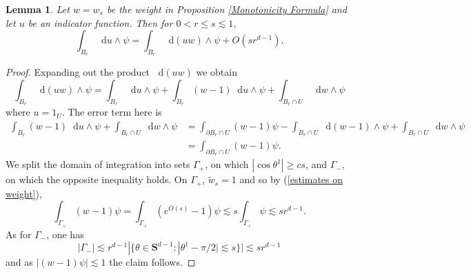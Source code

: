 \documentclass[reqno,12pt,letterpaper]{amsart}
\newcommand{\Sph}{\mathbf S}
\newcommand*\dif{\mathop{}\!\mathrm{d}}
\newtheorem{lemma}[theorem]{Lemma}
\theoremstyle{definition}
\numberwithin{equation}{section}
\begin{document}
\begin{lemma}\label{restore the weight}
Let $w = w_s$ be the weight in Proposition \ref{Monotonicity Formula} and let $u$ be an indicator function. Then for $0 < r \leq s \lesssim 1$,
$$\int_{B_r} \dif u \wedge \psi = \int_{B_r} \dif(uw) \wedge \psi + O(s r^{d - 1}).$$
\end{lemma}
\begin{proof}
Expanding out the product $\dif(uw)$ we obtain 
$$\int_{B_r} \dif(uw) \wedge \psi = \int_{B_r} \dif u \wedge \psi + \int_{B_r} (w - 1) \dif u \wedge \psi + \int_{B_r \cap U} \dif w \wedge \psi$$
where $u = 1_U$.
The error term here is 
\begin{align*}
\int_{B_r} (w - 1) \dif u \wedge \psi + \int_{B_r \cap U} \dif w \wedge \psi
&= \int_{\partial B_r \cap U} (w - 1)\psi - \int_{B_r \cap U} \dif (w - 1) \wedge \psi + \int_{B_r \cap U} \dif w \wedge \psi \\
&= \int_{\partial B_r \cap U} (w - 1)\psi.
\end{align*}
We split the domain of integration into sets $\Gamma_+$, on which $|\cos \theta^1| \geq cs$, and $\Gamma_-$, on which the opposite inequality holds.
On $\Gamma_+$, $\tilde w_s = 1$ and so by (\ref{estimates on weight}),
$$\int_{\Gamma_+} (w - 1) \psi = \int_{\Gamma_+} (e^{O(s)} - 1) \psi \lesssim s \int_{\Gamma_+} \psi \lesssim s r^{d - 1}.$$
As for $\Gamma_-$, one has 
$$|\Gamma_-| \lesssim r^{d - 1} |\{\theta \in \Sph^{d - 1}: |\theta^1 - \pi/2| \lesssim s\}| \lesssim sr^{d - 1}$$
and as $|(w - 1)\psi| \lesssim 1$ the claim follows.
\end{proof}
\end{document}
